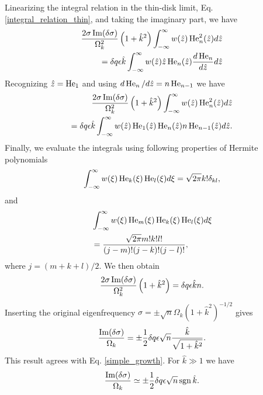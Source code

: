 Linearizing the integral relation in the thin-disk limit, Eq. \ref{integral_relation_thin}, and taking the
imaginary part, we have
\begin{align}
  \frac{2\sigma\operatorname{Im}(\delta\sigma)}{\Omega_k^2}
  \left(1+\hat{k}^2\right) \int_{-\infty}^{\infty} w(\hat{z})
  \operatorname{He}_n^2(\hat{z}) d\hat{z} \notag\\
  = \delta q \epsilon \hat{k} 
  \int_{-\infty}^{\infty}
  w(\hat{z})\hat{z}\operatorname{He}_n(\hat{z})\frac{d\operatorname{He}_n}{d\hat{z}} d\hat{z}
\end{align}
Recognizing $\hat{z} = \operatorname{He}_1$ and using $d\operatorname{He}_n/d\hat{z} = n
\operatorname{He}_{n-1}$ we have
 \begin{align}
   \frac{2\sigma\operatorname{Im}(\delta\sigma)}{\Omega_k^2}
   \left(1+\hat{k}^2\right) \int_{-\infty}^{\infty} w(\hat{z})
   \operatorname{He}_n^2(\hat{z}) d\hat{z} \notag\\
   =\delta q \epsilon \hat{k} 
   \int_{-\infty}^{\infty}
   w(\hat{z})\operatorname{He}_1(\hat{z})\operatorname{He}_n(\hat{z})n\operatorname{He}_{n-1}(\hat{z})d\hat{z}. 
 \end{align}
Finally, we evaluate the integrals using following properties of Hermite polynomials
\begin{align}
  \int_{-\infty}^{\infty}
  w(\xi) \operatorname{He}_k(\xi)\operatorname{He}_l(\xi) d\xi = \sqrt{2\pi}k!\delta_{kl}, 
\end{align}
and
\begin{align}
  &\int_{-\infty}^{\infty}
  w(\xi) \operatorname{He}_m(\xi)\operatorname{He}_k(\xi)\operatorname{He}_l(\xi) d\xi\notag\\& =
  \frac{\sqrt{2\pi}m!k!l!}{(j-m)!(j-k)!(j-l)!}, 
\end{align}
where $j = (m+k+l)/2$. We then obtain
 \begin{align}
  \frac{2\sigma\operatorname{Im}(\delta\sigma)}{\Omega_k^2}
  \left(1+\hat{k}^2\right) = \delta q \epsilon \hat{k} n.
 \end{align}
Inserting the original eigenfrequency $\sigma = \pm
\sqrt{n}\Omega_k(1+\hat{k}^2)^{-1/2}$ gives
\begin{align}
  \frac{\operatorname{Im}(\delta\sigma)}{\Omega_k} = \pm \frac{1}{2}\delta q \epsilon
  \sqrt{n} \frac{\hat{k}}{\sqrt{1+\hat{k}^2}}. 
\end{align}
This result agrees with Eq. \ref{simple_growth}.  
For $\hat{k}\gg 1$ we have
\begin{align}
  \frac{\operatorname{Im}(\delta\sigma)}{\Omega_k} \simeq \pm \frac{1}{2}\delta q \epsilon
  \sqrt{n} \operatorname{sgn}{\hat{k}}. 
\end{align}